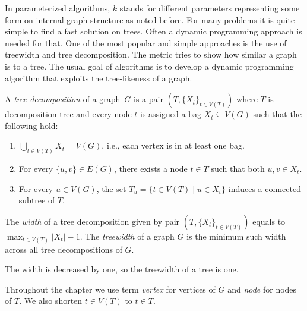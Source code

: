 In parameterized algorithms, \( k \) stands for different parameters
representing some form on internal graph structure as noted before.
%
For many problems it is quite simple to find a fast solution on trees.
Often a dynamic programming approach is needed for that.
%
One of the most popular and simple approaches
is the use of treewidth and tree decomposition.
The metric tries to show how similar a graph is to a tree.
%
The usual goal of algorithms is to develop a dynamic programming algorithm
that exploits the tree-likeness of a graph.

%
\begin{definition}
	A \emph{tree decomposition} of a graph~\( G \) is
	a pair \( (T, {\{X_t\}}_{t \in V ( T )}) \)
	where \( T \) is decomposition tree and every node \( t \)
	is assigned a bag \( X_t \subseteq V(G) \) such that the following hold:
	\begin{enumerate}
		\item \( \bigcup_{t \in V(T)} X_t = V(G) \),
		      i.e., each vertex is in at least one bag.
		\item For every \( \{u,v\} \in E(G) \), there exists
		      a node \( t \in T \) such that both \( u, v \in X_t \).
		\item For every \( u \in V(G) \),
		      the set \( T_u = \{t \in V(T) \mid u \in X_t\} \)
		      induces a connected subtree of \( T \).
	\end{enumerate}
\end{definition}
%
\begin{definition}
	The \emph{width} of a tree decomposition given by pair
	\( (T, {\{X_t\}}_{t \in V ( T )}) \)
	equals to \( \max_{t\in V(T)} |X_t| - 1 \).
	The \emph{treewidth} of a graph \( G \) is the minimum such width
	across all tree decompositions of \( G \).
\end{definition}
%
The width is decreased by one, so the treewidth of a tree is one.

Throughout the chapter we use term \emph{vertex} for vertices of \( G \)
and \emph{node} for nodes of \( T \).
We also shorten \( t \in V(T) \) to \( t \in T \).

